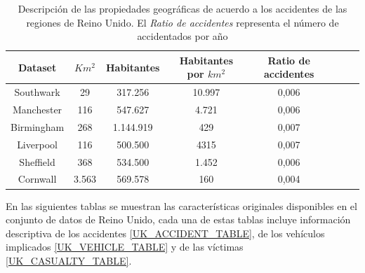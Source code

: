 \begin{table}[h!]
	\caption[Descripción de las propiedades geográficas de acuerdo a los accidentes de las regiones de Reino Unido]{Descripción de las propiedades geográficas de acuerdo a los accidentes de las regiones de Reino Unido. El \textit{Ratio de accidentes} representa el número de accidentados por año}
	\begin{center}
		\begin{tabular}{|c|c||c|c|c|c|c|c|}
			\hline
			\textbf{Dataset} & \textbf{$Km^2$} & \textbf{Habitantes} & \textbf{Habitantes por $km^2$} & \textbf{Ratio de accidentes}
			\\ \hline \hline
			Southwark   &  29   &   317.256  & 10.997  & 0,006 \\ \hline
			Manchester  &  116  &   547.627  &  4.721  & 0,006 \\ \hline
			Birmingham  &  268  & 1.144.919  &    429  & 0,007 \\ \hline
			Liverpool   &  116  &   500.500  &   4315  & 0,007 \\ \hline
			Sheffield   &  368  &   534.500  &  1.452  & 0,006  \\ \hline
			Cornwall    & 3.563 &   569.578  &    160  & 0,004 \\ \hline
		\end{tabular}
	\end{center}

	\label{UK_statistics}
\end{table}


En las siguientes tablas se muestran las características originales disponibles en el conjunto de datos de Reino Unido, cada una de estas tablas incluye información descriptiva de los accidentes \ref{UK_ACCIDENT_TABLE}, de los vehículos implicados \ref{UK_VEHICLE_TABLE} y de las víctimas \ref{UK_CASUALTY_TABLE}.

